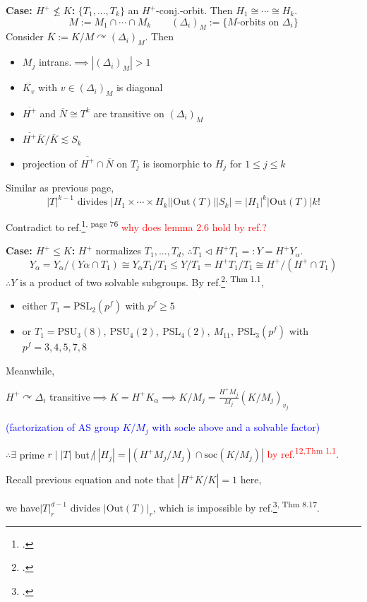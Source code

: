 \documentclass{beamer}
\def\PSL{\mathrm{PSL}}
\def\PSU{\mathrm{PSU}}
\def\Out{\mathrm{Out}}
\def\soc{\mathrm{soc}}
\begin{document}
\begin{frame}
\textbf{Case: $H^+\not\leq K$: } $\{T_1,...,T_k\}$ an $H^+$-conj.-orbit. Then $H_1\cong\cdots\cong H_k$.
\[M:=M_1\cap\cdots\cap M_k\qquad (\Delta_i)_M:=\{M\text{-orbits on }\Delta_i\} \]
Consider $\overline{K}:=K/M\curvearrowright(\Delta_i)_M$. Then

\begin{itemize}
	\item $M_j$ intrans.$\implies|(\Delta_i)_M|>1$
	\item $\overline{K_v}$ with $v\in (\Delta_i)_M$ is diagonal
	\item $\overline{H^+}$ and $\overline{N}\cong T^k$ are transitive on $(\Delta_i)_M$
	\item $\overline{H^+}\overline{K}/\overline{K}\lesssim S_k$
	\item projection of $\overline{H^+}\cap\overline{N}$ on $T_j$ is isomorphic to $H_j$ for $1\leq j\leq k$
\end{itemize}
Similar as previous page,
\[ |T|^{k-1}\text{ divides }|H_1\times\cdots\times H_k||\Out(T)||S_k|=|H_1|^k|\Out(T)|k! \]

Contradict to ref.\footcite{LI2022factorizations}\textsuperscript{, page 76} \qquad \textcolor{red}{why does lemma 2.6 hold by ref.?}
\end{frame}

\begin{frame}
\textbf{Case: $H^+\leq K$: } $H^+$ normalizes $T_1,...,T_d$, $\therefore T_1\triangleleft H^+T_1 =:Y=H^+Y_\alpha$.
\[ Y_\alpha= Y_\alpha/(Y\alpha\cap T_1)\cong Y_\alpha T_1/T_1\leq Y/T_1=H^+T_1/T_1\cong H^+/(H^+\cap T_1) \]
$\therefore Y$ is a product of two solvable subgroups. By ref.\footcite{KAZARIN1986prodsol}\textsuperscript{, Thm 1.1},
\begin{itemize}
	\item either $T_1=\PSL_2(p^f)$ with $p^f\geq 5$
	\item or $T_1=\PSU_3(8),\ \PSU_4(2),\ \PSL_4(2),\ M_{11},\ \PSL_3(p^f)$ with $p^f=3,4,5,7,8$
\end{itemize}
Meanwhile, 

\quad $H^+\curvearrowright\Delta_i$ transitive$\implies K=H^+K_\alpha\implies K/M_j=\frac{H^+M_j}{M_j}(K/M_j)_{v_j}$

\textcolor{blue}{(factorization of AS group $K/M_j$ with socle above and a solvable factor)}

$\therefore\exists$ prime $ r\mid |T|$ but $\not|\  |H_j|=|(H^+M_j/M_j)\cap\soc(K/M_j)|$ \textcolor{red}{ by ref.\textsuperscript{12,Thm 1.1}.}

Recall previous equation and note that $|H^+K/K|=1$ here,

we have$|T|_r^{d-1}$ divides $|\Out(T)|_r$, which is impossible by ref.\footcite{LI2022factorizations}\textsuperscript{, Thm 8.17}.
\end{frame}
\end{document}
